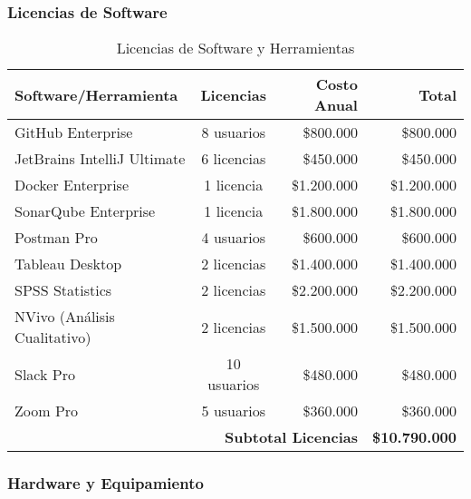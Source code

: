\subsubsection{Licencias de Software}

\begin{table}[H]
    \centering
    \caption{Licencias de Software y Herramientas}
    \label{tab:software_licenses}
    \small
    \begin{tabular}{|l|c|r|r|}
        \hline
        \textbf{Software/Herramienta} & \textbf{Licencias} & \textbf{Costo Anual} & \textbf{Total} \\
        \hline
        GitHub Enterprise & 8 usuarios & \$800.000 & \$800.000 \\
        \hline
        JetBrains IntelliJ Ultimate & 6 licencias & \$450.000 & \$450.000 \\
        \hline
        Docker Enterprise & 1 licencia & \$1.200.000 & \$1.200.000 \\
        \hline
        SonarQube Enterprise & 1 licencia & \$1.800.000 & \$1.800.000 \\
        \hline
        Postman Pro & 4 usuarios & \$600.000 & \$600.000 \\
        \hline
        Tableau Desktop & 2 licencias & \$1.400.000 & \$1.400.000 \\
        \hline
        SPSS Statistics & 2 licencias & \$2.200.000 & \$2.200.000 \\
        \hline
        NVivo (Análisis Cualitativo) & 2 licencias & \$1.500.000 & \$1.500.000 \\
        \hline
        Slack Pro & 10 usuarios & \$480.000 & \$480.000 \\
        \hline
        Zoom Pro & 5 usuarios & \$360.000 & \$360.000 \\
        \hline
        \multicolumn{3}{|r|}{\textbf{Subtotal Licencias}} & \textbf{\$10.790.000} \\
        \hline
    \end{tabular}
\end{table}

\subsubsection{Hardware y Equipamiento}

